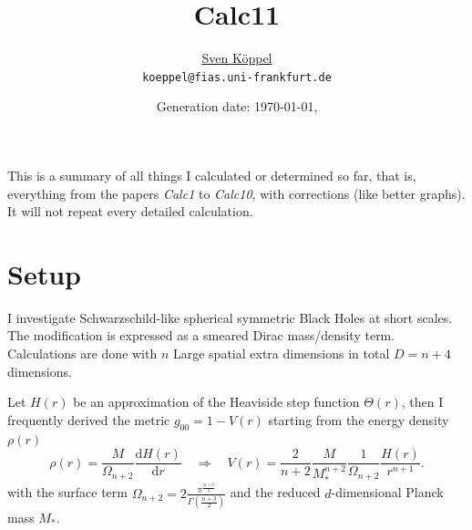 \documentclass[10pt,a4paper, fleqn]{article}
\title{\vspace{-9ex} Calc11 \vspace{-1ex}} %
\author{\small %
\href{https://itp.uni-frankfurt.de/~koeppel}{Sven Köppel} \\
\small \texttt{koeppel@fias.uni-frankfurt.de}}
\date{\small Generation date: \today, \currenttime}
\begin{document}
\maketitle

\renewcommand{\d}{\mathrm{d}}
\newcommand{\dd}[2]{\frac{\mathrm{d} #1}{\mathrm{d} #2}}
\newcommand{\pp}[2]{\frac{\partial #1}{\partial #2}}
\renewcommand{\L}{L_P}
\newcommand{\pr}{p_r}
\newcommand{\psenk}{p_\perp}
\newcommand{\ebenso}{\biggl( ~ \therefore ~ \biggr) }
\newcommand{\metrik}[1]{\d s^2 = \left( #1 \right) \d t^2 \left( #1 \right)^{-1} \d r^2 + r^2 \d \Omega_{D-2}^2 }
\newcommand{\winkel}{r^2 \d \Omega^2}
\newcommand{\dann}{$\rightarrow~$}
\newcommand{\CA}{ {\cal A}}
\newcommand{\C}[1]{ {\cal #1}}
\newcommand{\mn}{_{\mu\nu}}

\begin{multicols}{2}
This is a summary of all things I calculated or determined so far, that is, everything from the papers {\it Calc1} to {\it Calc10}, with corrections (like better graphs). It will not repeat every detailed calculation.

\columnbreak
\tableofcontents
\end{multicols}

\section{Setup}
I investigate Schwarzschild-like spherical symmetric Black Holes at short scales. The modification is expressed as a smeared Dirac mass/density term. Calculations are done with $n$ Large spatial extra dimensions in total $D=n+4$ dimensions.

Let $H(r)$ be an approximation of the Heaviside step function $\Theta(r)$, then I frequently derived the metric $g_{00}=1-V(r)$ starting from the energy density $\rho(r)$
%
\begin{equation}
\rho(r) = \frac M {\Omega_{n+2}} \dd{H(r)}r \quad\Rightarrow\quad
V(r) = \frac{2}{n+2} \frac{M}{M_*^{n+2}} {\frac{1}{\Omega_{n+2}}} \frac{H(r)}{r^{n+1}}.  \label{eq:start}
\end{equation}
%
with the surface term $\displaystyle \Omega_{n+2} = 2 \frac{\pi^\frac{n+3}{2}}{\Gamma\left(\frac{n+3}{2}\right)}$ and the reduced $d$-dimensional Planck mass $M_*$.
\end{document}
